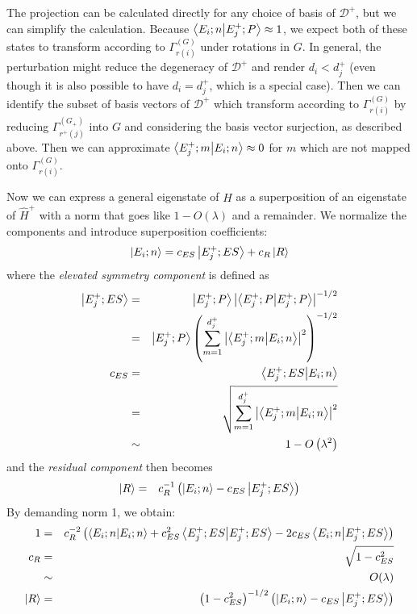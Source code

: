 \documentclass[12pt]{article}
\begin{document}
	The projection can be calculated directly for any choice of basis of $\mathcal{D}^+$, but we can simplify the calculation. Because $\braket{E_i;n}{E^+_j;P}\approx 1$, we expect both of these states to transform according to $\Gamma^{(G)}_{r(i)}$ under rotations in $G$. In general, the perturbation might reduce the degeneracy of $\mathcal{D}^+$ and render $d_i<d^+_j$ (even though it is also possible to have $d_i=d^+_j$, which is a special case). Then we can identify the subset of basis vectors of $\mathcal{D}^+$ which transform according to 	$\Gamma^{(G)}_{r(i)}$ by reducing $\Gamma^{(G_+)}_{r^+(j)}$ into $G$ and considering the basis vector surjection, as described above. Then we can approximate $\braket{E^+_j;m}{E_i;n}\approx 0$ for $m$ which are not mapped onto $\Gamma^{(G)}_{r(i)}$.
	
	Now we can express a general eigenstate of $\hat{H}$ as a superposition of an eigenstate of $\hat{H}^+$ with a norm that goes like $1-O(\lambda)$ and a remainder. We normalize the components and introduce superposition coefficients:
	$$\ket{E_i;n}=c_{ES}\ket{E^+_j;ES}+c_R\ket{R}$$
	where the \textit{elevated symmetry component} is defined as
	\begin{eqnarray*}
	\ket{E^+_j;ES}&=&\ket{E^+_j;P}\abs{\braket{E^+_j;P}{E^+_j;P}}^{-1/2}\\
	&=&\ket{E^+_j;P}\left(\sum_{m=1}^{d^+_j}\abs{\braket{E^+_j;m}{E_i;n}}^2\right)^{-1/2}\\
	c_{ES}&=&\braket{E^+_j;ES}{E_i;n}\\
	&=&\sqrt{\sum_{m=1}^{d^+_j}\abs{\braket{E^+_j;m}{E_i;n}}^2}\\
	&\sim& 1-O\left(\lambda^2\right)
	\end{eqnarray*}
	and the \textit{residual component} then becomes
	\begin{eqnarray*}
	\ket{R}&=&c_R^{-1}\left(\ket{E_i;n}-c_{ES}\ket{E^+_j;ES}\right)
	\end{eqnarray*}
	By demanding norm 1, we obtain:
	\begin{eqnarray*}
	1&=&c_R^{-2}\left(\braket{E_i;n}{E_i;n}+c_{ES}^2\braket{E^+_j;ES}{E^+_j;ES}-2c_{ES}\braket{E_i;n}{E^+_j;ES}\right)\\
	c_R&=&\sqrt{1-c_{ES}^2}\\
	&\sim & O(\lambda)\\
	\ket{R}&=& \left(1-c_{ES}^2\right)^{-1/2}\left(\ket{E_i;n}-c_{ES}\ket{E^+_j;ES}\right)
	\end{eqnarray*}
	
\end{document}
